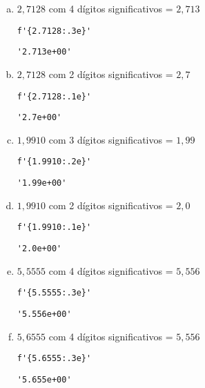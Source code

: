 \begin{resol}
  \begin{enumerate}[a)]
  \item $2,7128$ com 4 dígitos significativos = $2,713$

\begin{lstlisting}
f'{2.7128:.3e}'
\end{lstlisting}

\begin{verbatim}
'2.713e+00'
\end{verbatim}

    \item $2,7128$ com 2 dígitos significativos = $2,7$

\begin{lstlisting}
f'{2.7128:.1e}'
\end{lstlisting}

\begin{verbatim}
'2.7e+00'
\end{verbatim}

    \item $1,9910$ com 3 dígitos significativos = $1,99$

\begin{lstlisting}
f'{1.9910:.2e}'
\end{lstlisting}

\begin{verbatim}
'1.99e+00'
\end{verbatim}

\item $1,9910$ com 2 dígitos significativos = $2,0$
    
\begin{lstlisting}
f'{1.9910:.1e}'
\end{lstlisting}

\begin{verbatim}
'2.0e+00'
\end{verbatim}
        
  \item $5,5555$ com 4 dígitos significativos = $5,556$
    
\begin{lstlisting}
f'{5.5555:.3e}'
\end{lstlisting}

\begin{verbatim}
'5.556e+00'
\end{verbatim}
        
  \item $5,6555$ com 4 dígitos significativos = $5,556$
    
\begin{lstlisting}
f'{5.6555:.3e}'
\end{lstlisting}

\begin{verbatim}
'5.655e+00'
\end{verbatim}
        
  \end{enumerate}
\end{resol}

